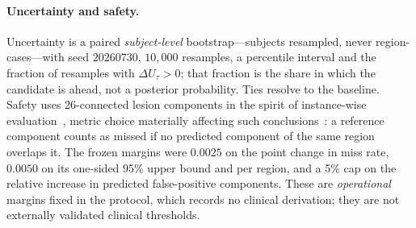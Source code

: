 \documentclass[runningheads]{llncs}
\begin{document}
\paragraph{Uncertainty and safety.} Uncertainty is a paired \emph{subject-level} bootstrap---subjects
resampled, never region-cases---with seed $20260730$, $10{,}000$ resamples, a percentile interval and
the fraction of resamples with $\Delta U_\tau>0$; that fraction is the share in which the candidate is
ahead, not a posterior probability. Ties resolve to the baseline. Safety uses 26-connected lesion
components in the spirit of instance-wise evaluation~\cite{kofler2023panoptica}, metric choice
materially affecting such conclusions~\cite{reinke2024metricsreloaded}: a reference component counts
as missed if no predicted component of the same region overlaps it. The frozen margins were $0.0025$ on the point change in miss rate, $0.0050$ on its one-sided 95\%
upper bound and per region, and a 5\% cap on the relative increase in predicted false-positive
components. These are \emph{operational} margins fixed in the protocol, which records no clinical
derivation; they are not externally validated clinical thresholds.
\end{document}
